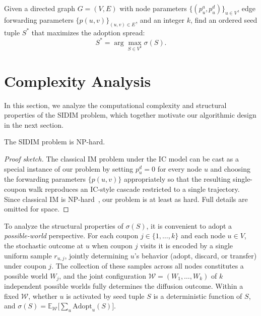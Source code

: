 \documentclass[sigconf]{acmart}
\begin{document}
\begin{definition}[SIDIM]
Given a directed graph $G = (V, E)$ with node parameters $\{(p_u^a, p_u^d)\}_{u \in V}$, edge forwarding parameters $\{p(u, v)\}_{(u, v) \in E}$, and an integer $k$, find an ordered seed tuple $S^*$ that maximizes the adoption spread:
\begin{equation}
S^* = \arg\max_{S \in V^k} \sigma(S).
\end{equation}
\end{definition}


\section{Complexity Analysis}

In this section, we analyze the computational complexity and structural properties of the SIDIM problem, which together motivate our algorithmic design in the next section.

\begin{theorem}
\label{thm:nphard}
The SIDIM problem is NP-hard.
\end{theorem}

\begin{proof}[Proof sketch]
The classical IM problem under the IC model can be cast as a special instance of our problem by setting $p_u^d = 0$ for every node $u$ and choosing the forwarding parameters $\{p(u, v)\}$ appropriately so that the resulting single-coupon walk reproduces an IC-style cascade restricted to a single trajectory. Since classical IM is NP-hard~\cite{kempe2003maximizing}, our problem is at least as hard. Full details are omitted for space.
\end{proof}

To analyze the structural properties of $\sigma(S)$, it is convenient to adopt a \emph{possible-world} perspective. For each coupon $j \in \{1, \ldots, k\}$ and each node $u \in V$, the stochastic outcome at $u$ when coupon $j$ visits it is encoded by a single uniform sample $r_{u,j}$, jointly determining $u$'s behavior (adopt, discard, or transfer) under coupon $j$. The collection of these samples across all nodes constitutes a possible world $W_j$, and the joint configuration $\mathcal{W} = (W_1, \ldots, W_k)$ of $k$ independent possible worlds fully determines the diffusion outcome. Within a fixed $\mathcal{W}$, whether $u$ is activated by seed tuple $S$ is a deterministic function of $S$, and $\sigma(S) = \mathbb{E}_{\mathcal{W}}\bigl[\sum_u \mathrm{Adopt}_u(S)\bigr]$.
\end{document}
